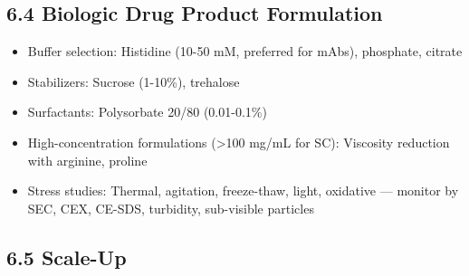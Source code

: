 \documentclass[
  11pt,
  a4paper,
]{report}
\providecommand{\tightlist}{%
  \setlength{\itemsep}{0pt}\setlength{\parskip}{0pt}}
\begin{document}
\hypertarget{biologic-drug-product-formulation}{%
\subsection{6.4 Biologic Drug Product
Formulation}\label{biologic-drug-product-formulation}}

\begin{itemize}
\tightlist
\item
  Buffer selection: Histidine (10-50 mM, preferred for mAbs), phosphate,
  citrate
\item
  Stabilizers: Sucrose (1-10\%), trehalose
\item
  Surfactants: Polysorbate 20/80 (0.01-0.1\%)
\item
  High-concentration formulations (\textgreater100 mg/mL for SC):
  Viscosity reduction with arginine, proline
\item
  Stress studies: Thermal, agitation, freeze-thaw, light, oxidative ---
  monitor by SEC, CEX, CE-SDS, turbidity, sub-visible particles
\end{itemize}

\hypertarget{scale-up}{%
\subsection{6.5 Scale-Up}\label{scale-up}}
\end{document}
